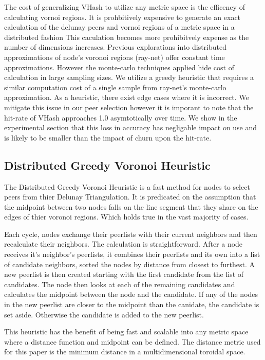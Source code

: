 \documentclass{IEEEtran}
\begin{document}
The cost of generalizing VHash to utilize any metric space is the efficency of calculating vornoi regions. It is prohbitively expensive to generate an exact calculation of the delunay peers and vornoi regions of a metric space in a distributed fashion\cite{raynet}%
This caculation becomes more prohibitvely expense as the number of dimensions increases. Previous explorations into distributed approximations of node's voronoi regions (ray-net) offer constant time approximations. However the monte-carlo techniques applied hide cost of calculation in large sampling sizes. We utilize a greedy heuristic that requires a similar computation cost of a single sample from ray-net's monte-carlo approximation. As a heuristic, there exist edge cases where it is incorrect. We mitigate this issue in our peer selection however it is imporant to note that the hit-rate of VHash approaches 1.0 asymtotically over time. We show in the experimental section that this loss in accuracy has negligable impact on use and is likely to be smaller than the impact of churn upon the hit-rate.

\subsection{Distributed Greedy Voronoi Heuristic}
The Distributed Greedy Voronoi Heuristic is a fast method for nodes to select peers from thier Delunay Triangulation. It is predicated on the assumption that the midpoint between two nodes falls on the line segment that they share on the edges of thier voronoi regions. Which holds true in the vast majority of cases.

Each cycle, nodes exchange their peerlists with their current neighbors and then recalculate their neighbors.  
The calculation is straightforward.
After a node receives it's neighbor's peerlists, it combines their peerlists and its own into a list of candidate neighbors, sorted the nodes by distance from closest to furthest.
A new peerlist is then created starting with the first candidate from the list of candidates.
The node then looks at each of the remaining candidates and calculates the midpoint between the node and the candidate.
If any of the nodes in the new peerlist are closer to the midpoint than the canidate, the candidate is set aside.  Otherwise the candidate is added to the new peerlist.

This heuristic has the benefit of being fast and scalable into any metric space where a distance function and midpoint can be defined.
The distance metric used for this paper is the minimum distance in a multidimensional toroidal space. %
\end{document}
